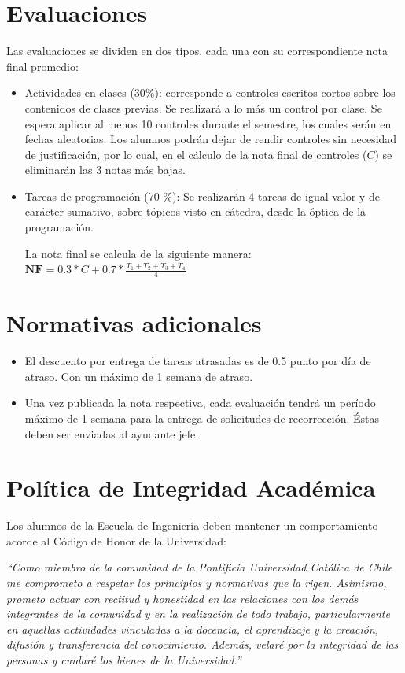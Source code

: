 \documentclass[11pt,letterpaper]{article}
\begin{document}
\section{Evaluaciones}
Las evaluaciones se dividen en dos tipos, cada una con su correspondiente nota
final promedio:

\begin{itemize}
 \item Actividades en clases (30\%): corresponde a controles escritos cortos
   sobre los contenidos de clases previas. Se realizará a lo más un control por
   clase. Se espera aplicar al menos 10 controles durante el semestre, los
   cuales serán en fechas aleatorias. Los alumnos podrán dejar de rendir
   controles sin necesidad de justificación, por lo cual, en el cálculo de la
   nota final de controles ($C$) se eliminarán las 3 notas más bajas.

\item Tareas de programación (70 \%): Se realizarán 4 tareas de igual valor y de
  carácter sumativo, sobre tópicos visto en cátedra, desde la óptica de la
  programación.

La nota final se calcula de la siguiente manera: $\textbf{NF} = 0.3 * C + 0.7 *
\frac{T_1 + T_2 + T_3 + T_4}{4}$
\end{itemize}



\section{Normativas adicionales}
\begin{itemize}
 \item El descuento por entrega de tareas atrasadas es de 0.5 punto por día de
   atraso. Con un máximo de 1 semana de atraso.
 \item Una vez publicada la nota respectiva, cada evaluación tendrá un período
   m\'aximo de 1 semana para la entrega de solicitudes de recorrección. \'Estas
   deben ser enviadas al ayudante jefe.
\end{itemize}


\section{Política de Integridad Académica}
Los alumnos de la Escuela de Ingeniería deben mantener un comportamiento acorde
al Código de Honor de la Universidad:

\begin{flushleft}
\textit{``Como miembro de la comunidad de la Pontificia Universidad Católica de
  Chile me comprometo a respetar los principios y normativas que la rigen.
  Asimismo, prometo actuar con rectitud y honestidad en las relaciones con los
  demás integrantes de la comunidad y en la realización de todo trabajo,
  particularmente en aquellas actividades vinculadas a la docencia, el
  aprendizaje y la creación, difusión y transferencia del conocimiento. Además,
  velaré por la integridad de las personas y cuidaré los bienes de la
  Universidad.''}
\end{flushleft}
\end{document}
